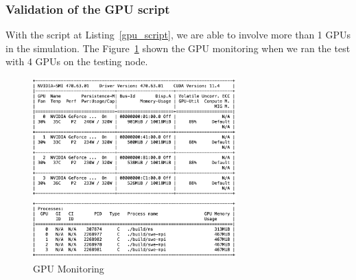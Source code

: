 \documentclass[article]{scrartcl}
\begin{document}
\subsubsection{Validation of the GPU script}
With the script at Listing~\ref{gpu_script}, we are able to involve more than 1 GPUs in the simulation. The Figure~\ref{fig:GPUMonitor} shown the GPU monitoring when we ran the test with 4 GPUs on the testing node.
\begin{figure}[htpb]
	\centering
	\includegraphics[width=0.7\textwidth,keepaspectratio=true]{../figs/cuda4096-4.png}
	\caption{GPU Monitoring}
	\label{fig:GPUMonitor}
\end{figure}
\end{document}
